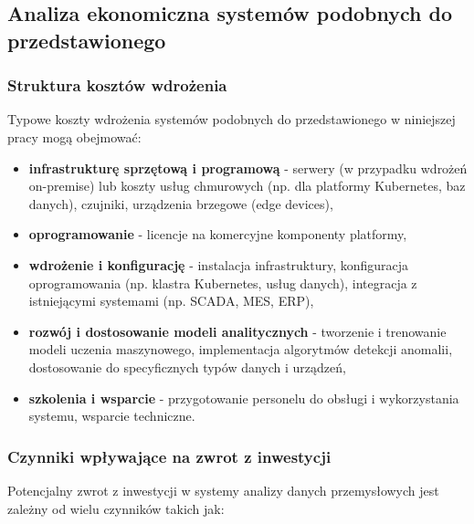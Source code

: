 \subsection{Analiza ekonomiczna systemów podobnych do przedstawionego}
\label{subsec:analiza_ekonomiczna}

\subsubsection{Struktura kosztów wdrożenia}
\label{subsubsec:struktura_kosztow}

Typowe koszty wdrożenia systemów podobnych do przedstawionego w niniejszej pracy mogą obejmować:

\begin{itemize}
    \item \textbf{infrastrukturę sprzętową i programową} - serwery (w przypadku wdrożeń on-premise) lub koszty usług chmurowych (np. dla platformy Kubernetes, baz danych), czujniki, urządzenia brzegowe (edge devices),
    \item \textbf{oprogramowanie} - licencje na komercyjne komponenty platformy,
    \item \textbf{wdrożenie i konfigurację} - instalacja infrastruktury, konfiguracja oprogramowania (np. klastra Kubernetes, usług danych), integracja z istniejącymi systemami (np. SCADA, MES, ERP),
    \item \textbf{rozwój i dostosowanie modeli analitycznych} - tworzenie i trenowanie modeli uczenia maszynowego, implementacja algorytmów detekcji anomalii, dostosowanie do specyficznych typów danych i urządzeń,
    \item \textbf{szkolenia i wsparcie} - przygotowanie personelu do obsługi i wykorzystania systemu, wsparcie techniczne.
\end{itemize}

\subsubsection{Czynniki wpływające na zwrot z inwestycji}
\label{subsubsec:analiza_roi}

Potencjalny zwrot z inwestycji w systemy analizy danych przemysłowych jest zależny od wielu czynników takich jak:

